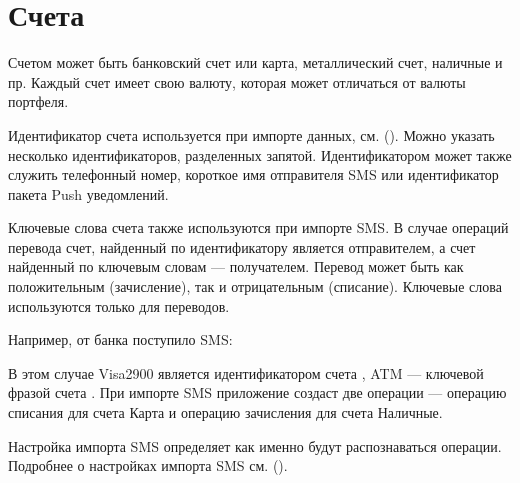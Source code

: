 \documentclass[a4paper,10pt,russian]{sphinxmanual}
\begin{document}
\section{Счета}
\label{\detokenize{directories:id4}}
\sphinxAtStartPar
Счетом может быть банковский счет или карта, металлический счет,
наличные и пр. Каждый счет имеет свою валюту, которая может отличаться от валюты портфеля.

\sphinxAtStartPar
Идентификатор счета используется при импорте данных, см. {\hyperref[\detokenize{import:chapter-import}]{}} (). Можно указать несколько
идентификаторов, разделенных запятой. Идентификатором может также служить телефонный номер, короткое имя отправителя SMS
или идентификатор пакета Push уведомлений.

\sphinxAtStartPar
Ключевые слова счета также используются при импорте SMS. В случае операций перевода счет, найденный по идентификатору
является отправителем, а счет найденный по ключевым словам — получателем. Перевод может быть как положительным
(зачисление), так и отрицательным (списание). Ключевые слова используются только для переводов.

\sphinxAtStartPar
Например, от банка поступило SMS:

\begin{sphinxVerbatim}[commandchars=\\\{\}]
         
\end{sphinxVerbatim}

\sphinxAtStartPar
В этом случае Visa2900 является идентификатором счета , ATM — ключевой фразой счета . При импорте SMS приложение создаст
две операции — операцию списания для счета Карта и операцию зачисления для счета Наличные.

\sphinxAtStartPar
Настройка импорта SMS определяет как именно будут распознаваться операции.
Подробнее о настройках импорта SMS см. {\hyperref[\detokenize{notifications:chapter-notifications}]{}} ().
\end{document}
